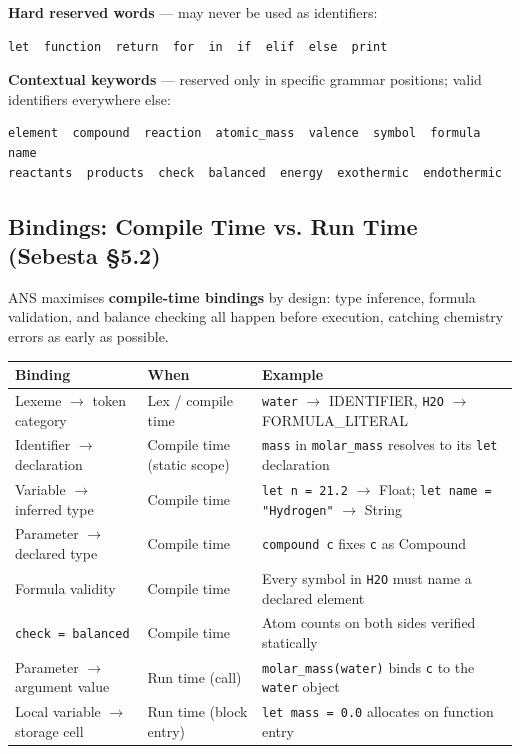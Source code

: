 \documentclass[11pt,a4paper]{article}
\newcommand{\code}[1]{\texttt{#1}}
\begin{document}
\textbf{Hard reserved words} --- may never be used as identifiers:
\begin{lstlisting}[style=ans, aboveskip=4pt, belowskip=4pt]
let  function  return  for  in  if  elif  else  print
\end{lstlisting}

\textbf{Contextual keywords} --- reserved only in specific grammar positions; valid identifiers everywhere else:
\begin{lstlisting}[style=ans, aboveskip=4pt, belowskip=4pt]
element  compound  reaction  atomic_mass  valence  symbol  formula  name
reactants  products  check  balanced  energy  exothermic  endothermic
\end{lstlisting}

\subsection{Bindings: Compile Time vs. Run Time (Sebesta \S5.2)}
ANS maximises \textbf{compile-time bindings} by design: type inference, formula validation, and balance checking all happen before execution, catching chemistry errors as early as possible.

\begin{table}[h]
\centering
\begin{tabularx}{\textwidth}{@{} l l Y @{}}
\toprule
\textbf{Binding} & \textbf{When} & \textbf{Example} \\
\midrule
Lexeme $\to$ token category & Lex / compile time & \code{water} $\to$ IDENTIFIER, \code{H2O} $\to$ FORMULA\_LITERAL \\
Identifier $\to$ declaration & Compile time (static scope) & \code{mass} in \code{molar\_mass} resolves to its \code{let} declaration \\
Variable $\to$ inferred type & Compile time & \code{let n = 21.2} $\to$ Float; \code{let name = "Hydrogen"} $\to$ String \\
Parameter $\to$ declared type & Compile time & \code{compound c} fixes \code{c} as Compound \\
Formula validity & Compile time & Every symbol in \code{H2O} must name a declared element \\
\code{check = balanced} & Compile time & Atom counts on both sides verified statically \\
Parameter $\to$ argument value & Run time (call) & \code{molar\_mass(water)} binds \code{c} to the \code{water} object \\
Local variable $\to$ storage cell & Run time (block entry) & \code{let mass = 0.0} allocates on function entry \\
\bottomrule
\end{tabularx}
\end{table}
\end{document}
